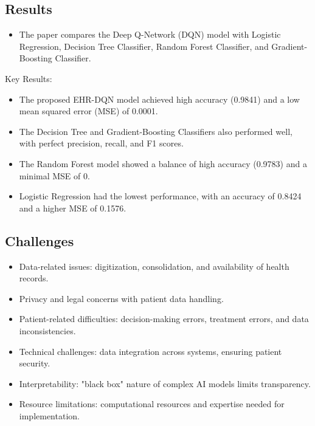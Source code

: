 \subsection*{Results}
\begin{itemize}
    \item The paper compares the Deep Q-Network (DQN) model with Logistic Regression, Decision Tree Classifier, Random Forest Classifier, and Gradient-Boosting Classifier.
\end{itemize}

Key Results:
\begin{itemize}
    \item The proposed EHR-DQN model achieved high accuracy (0.9841) and a low mean squared error (MSE) of 0.0001.
    \item The Decision Tree and Gradient-Boosting Classifiers also performed well, with perfect precision, recall, and F1 scores.
    \item The Random Forest model showed a balance of high accuracy (0.9783) and a minimal MSE of 0.
    \item Logistic Regression had the lowest performance, with an accuracy of 0.8424 and a higher MSE of 0.1576.
\end{itemize}

\subsection*{Challenges}
\begin{itemize}
    \item Data-related issues: digitization, consolidation, and availability of health records.
    \item Privacy and legal concerns with patient data handling.
    \item Patient-related difficulties: decision-making errors, treatment errors, and data inconsistencies.
    \item Technical challenges: data integration across systems, ensuring patient security.
    \item Interpretability: "black box" nature of complex AI models limits transparency.
    \item Resource limitations: computational resources and expertise needed for implementation.
\end{itemize}

